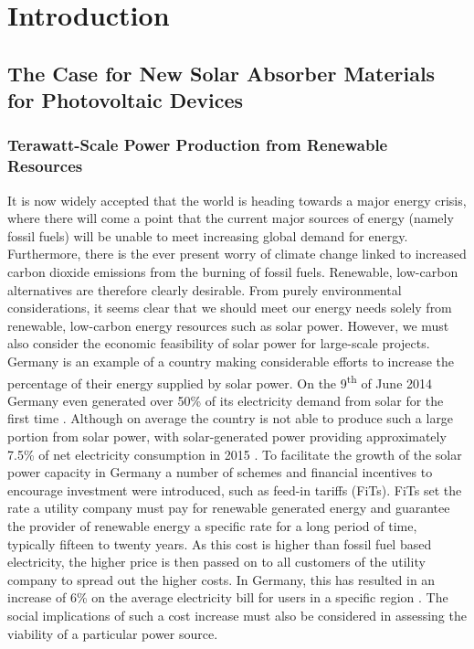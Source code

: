 \chapter{Introduction}

\section{The Case for New Solar Absorber Materials for Photovoltaic Devices}

\subsection{Terawatt-Scale Power Production from Renewable Resources}

It is now widely accepted that the world is heading towards a major energy crisis, where there will come a point that the current major sources of energy (namely fossil fuels) will be unable to meet increasing global demand for energy. Furthermore, there is the ever present worry of climate change linked to increased carbon dioxide emissions from the burning of fossil fuels. Renewable, low-carbon alternatives are therefore clearly desirable. From purely environmental considerations, it seems clear that we should meet our energy needs solely from renewable, low-carbon energy resources such as solar power. However, we must also consider the economic feasibility of solar power for large-scale projects. Germany is an example of a country making considerable efforts to increase the percentage of their energy supplied by solar power. On the 9\textsuperscript{th} of June 2014 Germany even generated over 50\% of its electricity demand from solar for the first time \cite{Germany_guardian_news}. Although on average the country is not able to produce such a large portion from solar power, with solar-generated power providing approximately 7.5\% of net electricity consumption in 2015 \cite{Germany_PV}. To facilitate the growth of the solar power capacity in Germany a number of schemes and financial incentives to encourage investment were introduced, such as feed-in tariffs (FiTs).
FiTs set the rate a utility company must pay for renewable generated energy and guarantee the provider of renewable energy a specific rate for a long period of time, typically fifteen to twenty years. As this cost is higher than fossil fuel based electricity, the higher price is then passed on to all customers of the utility company to spread out the higher costs. In Germany, this has resulted in an increase of 6\% on the average electricity bill for users in a specific region \cite{Germany_Oregon}. The social implications of such a cost increase must also be considered in assessing the viability of a particular power source.

